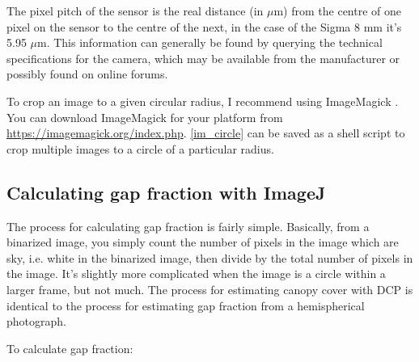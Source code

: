 \documentclass[11pt,a4paper]{article}
\newcommand\file[1]{\texttt{\color{file}#1}}  %
\begin{document}
\begin{minipage}{\linewidth}

\end{minipage}

The pixel pitch of the sensor is the real distance (in $\mu$m) from the centre of one pixel on the sensor to the centre of the next, in the case of the Sigma 8 mm it's 5.95 $\mu$m. This information can generally be found by querying the technical specifications for the camera, which may be available from the manufacturer or possibly found on online forums.

To crop an image to a given circular radius, I recommend using ImageMagick \citep{imagemagick}. You can download ImageMagick for your platform from \url{https://imagemagick.org/index.php}. \autoref{im_circle} can be saved as a shell script to crop multiple images to a circle of a particular radius.

\begin{minipage}{\linewidth}

\end{minipage}


\subsection{Calculating gap fraction with ImageJ} \label{gapfrac}

The process for calculating gap fraction is fairly simple. Basically, from a  binarized image, you simply count the number of pixels in the image which are sky, i.e. white in the binarized image, then divide by the total number of pixels in the image. It's slightly more complicated when the image is a circle within a larger frame, but not much. The process for estimating canopy cover with DCP is identical to the process for estimating gap fraction from a hemispherical photograph. 

To calculate gap fraction: 
\end{document}
